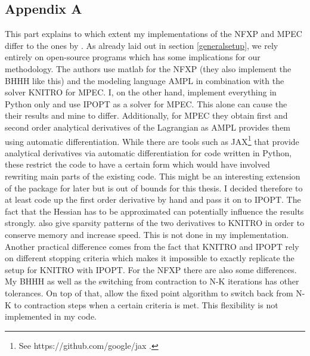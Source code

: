 

\thispagestyle{plain} %

\subsection{Appendix A} \label{appendixA}
\thispagestyle{plain} %

This part explains to which extent my implementations of the NFXP and MPEC differ to the ones by \cite{Iskhakov.2016}. As already laid out in section \ref{generalsetup}, we rely entirely on open-source programs which has some implications for our methodology. The authors use matlab for the NFXP (they also implement the BHHH like this) and the modeling language AMPL in combination with the solver KNITRO for MPEC. I, on the other hand, implement everything in Python only and use IPOPT as a solver for MPEC. This alone can cause the their results and mine to differ. Additionally, for MPEC they obtain first and second order analytical derivatives of the Lagrangian as AMPL provides them using automatic differentiation. While there are tools such as JAX\footnote{See https://github.com/google/jax .} that provide analytical derivatives via automatic differentiation for code written in Python, these restrict the code to have a certain form which would have involved rewriting main parts of the existing code. This might be an interesting extension of the package for later but is out of bounds for this thesis. I decided therefore to at least code up the first order derivative by hand and pass it on to IPOPT. The fact that the Hessian has to be approximated can potentially influence the results strongly. \citeauthor{Iskhakov.2016} also give sparsity patterns of the two derivatives to KNITRO in order to conserve memory and increase speed. This is not done in my implementation. Another practical difference comes from the fact that KNITRO and IPOPT rely on different stopping criteria which makes it impossible to exactly replicate the setup for KNITRO with IPOPT. For the NFXP there are also some differences. My BHHH as well as the switching from contraction to N-K iterations has other tolerances. On top of that, \citeauthor{Iskhakov.2016} allow the fixed point algorithm to switch back from N-K to contraction steps when a certain criteria is met. This flexibility is not implemented in my code.

